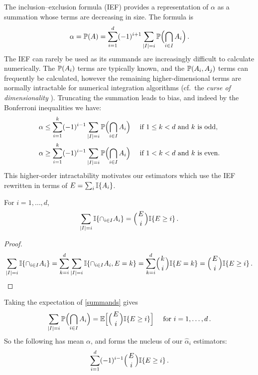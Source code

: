 The inclusion--exclusion formula (IEF) provides a representation of $\alpha$
as a summation whose terms are decreasing in size.
The formula is
\begin{equation} \label{incl_excl}
 \alpha = \operatorname{{\mathbb P}}(A)
  =\sum_{i=1}^d  (-1)^{i+1} \sum_{\lvert I\rvert= i}  \operatorname{{\mathbb P}}\Bigl(\bigcap_{i\in I}A_i\Bigr)  \,.
\end{equation}
The IEF can rarely be used as its summands are increasingly difficult to calculate numerically.
The $\operatorname{{\mathbb P}}(A_i)$ terms are typically known, and the $\operatorname{{\mathbb P}}(A_i,A_j)$ terms can frequently be calculated, however the remaining higher-dimensional terms are normally intractable for numerical integration algorithms (cf.\ the \emph{curse of dimensionality} \cite[Chapter IX]{asmussen2007stochastic}).
Truncating the summation leads to bias, and indeed by the Bonferroni inequalities we have:
\begin{align}
  \alpha &\le \sum_{i=1}^k  (-1)^{i-1} \sum_{\lvert I\rvert= i} \operatorname{{\mathbb P}}\Bigl(\bigcap_{i\in I}A_i\Bigr) \quad \text{ if } 1\le k < d \text{ and } k \text{ is odd}, \label{bonf_odd} \\
  \alpha &\ge \sum_{i=1}^k  (-1)^{i-1} \sum_{\lvert I\rvert= i} \operatorname{{\mathbb P}}\Bigl(\bigcap_{i\in I}A_i\Bigr) \quad \text{ if } 1<k<d \text{ and } k \text{ is even}. \label{bonf_even}
\end{align}
This higher-order intractability motivates our estimators which use the IEF rewritten in terms of $E = \sum_i \mathbb{I}\{  A_i  \}$.

\begin{proposition} \label{prop:means_of_binomial}
For $i = 1,\dots, d$,
\begin{equation} \label{summands}
  \sum_{\card{I}=i} \ind{\cap_{i\in I}A_i} = \BigBinom{E}{i} \ind{E \ge i}  \,.
\end{equation}
\end{proposition}
\begin{proof}
\begin{align*}
\sum_{\card{I}=i} \ind{ \cap_{i\in I}A_i } =
\sum_{k=i}^{d} \sum_{\card{I}=i} \ind{ \cap_{i\in I}A_i, E = k }
= \sum_{k=i}^{d} \BigBinom{k}{i} \ind{E = k }
= \BigBinom{E}{i} \ind{E \ge i} \,.
\end{align*}
\end{proof}
Taking the expectation of \eqref{summands} gives
\begin{equation*}
 \sum_{\card{I}=i} \Prob\Bigl(\bigcap_{i\in I}A_i\Bigr) = \Exp\Bigl[ \BigBinom{E}{i} \ind{E \ge i} \Bigr] \quad \text{ for } i=1,\dots,d \,.
\end{equation*}
So the following has mean $\alpha$, and forms the nucleus of our $\hat{\alpha}_i$ estimators:
\begin{equation} \label{estimator_incl_excl}
	\sum_{i=1}^d (-1)^{i-1} \BigBinom{E}{i} \ind{E\ge i} \,.
\end{equation}

